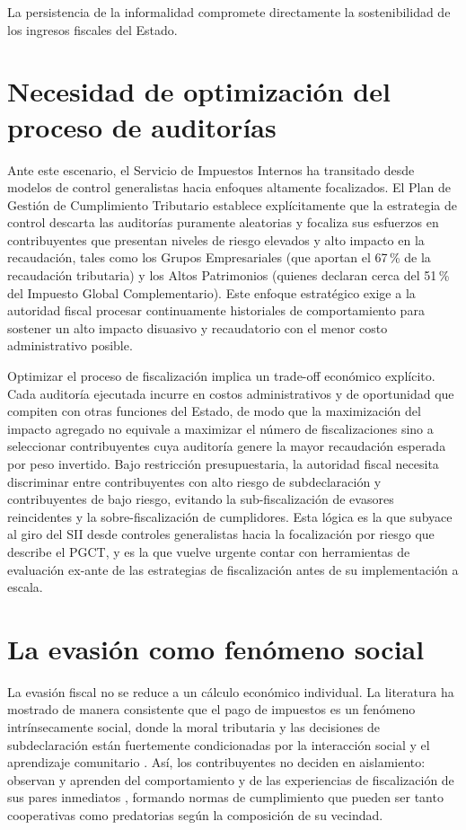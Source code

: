 La persistencia de la informalidad compromete directamente la sostenibilidad de los ingresos fiscales del Estado.

\section{Necesidad de optimización del proceso de auditorías}
\label{sec:optimizacion-auditoria}

Ante este escenario, el Servicio de Impuestos Internos ha transitado desde modelos de control generalistas hacia enfoques altamente focalizados. El Plan de Gestión de Cumplimiento Tributario \parencite{sii2026pgct} establece explícitamente que la estrategia de control descarta las auditorías puramente aleatorias y focaliza sus esfuerzos en contribuyentes que presentan niveles de riesgo elevados y alto impacto en la recaudación, tales como los Grupos Empresariales (que aportan el 67\,\% de la recaudación tributaria) y los Altos Patrimonios (quienes declaran cerca del 51\,\% del Impuesto Global Complementario). Este enfoque estratégico exige a la autoridad fiscal procesar continuamente historiales de comportamiento para sostener un alto impacto disuasivo y recaudatorio con el menor costo administrativo posible.

Optimizar el proceso de fiscalización implica un trade-off económico explícito. Cada auditoría ejecutada incurre en costos administrativos y de oportunidad que compiten con otras funciones del Estado, de modo que la maximización del impacto agregado no equivale a maximizar el número de fiscalizaciones sino a seleccionar contribuyentes cuya auditoría genere la mayor recaudación esperada por peso invertido. Bajo restricción presupuestaria, la autoridad fiscal necesita discriminar entre contribuyentes con alto riesgo de subdeclaración y contribuyentes de bajo riesgo, evitando la sub-fiscalización de evasores reincidentes y la sobre-fiscalización de cumplidores. Esta lógica es la que subyace al giro del SII desde controles generalistas hacia la focalización por riesgo que describe el PGCT, y es la que vuelve urgente contar con herramientas de evaluación ex-ante de las estrategias de fiscalización antes de su implementación a escala.

\section{La evasión como fenómeno social}
\label{sec:evasion-social}

La evasión fiscal no se reduce a un cálculo económico individual. La literatura ha mostrado de manera consistente que el pago de impuestos es un fenómeno intrínsecamente social, donde la moral tributaria y las decisiones de subdeclaración están fuertemente condicionadas por la interacción social y el aprendizaje comunitario \parencite{arslan2013effects, andrei2014agent}. Así, los contribuyentes no deciden en aislamiento: observan y aprenden del comportamiento y de las experiencias de fiscalización de sus pares inmediatos \parencite{arslan2013effects}, formando normas de cumplimiento que pueden ser tanto cooperativas como predatorias según la composición de su vecindad.

